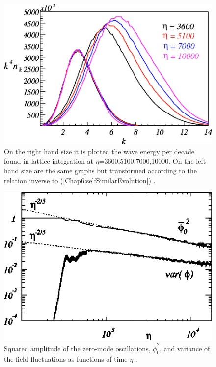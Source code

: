 \documentclass[11pt,a4paper,twoside]{book}
\begin{document}
\begin{figure}
	\centering
	\includegraphics[width=0.6\linewidth, height=0.3\textheight]{Images/Chap6/TurbolentThermalitation_fig3}
	\caption{On the right hand size it is plotted the wave energy per decade found in lattice integration at $\eta$=3600,5100,7000,10000. On the left hand size are the same graphs but transformed according to the relation inverse to (\ref{Chap6:selfSimilarEvolution}) \cite{Chap6:TurbolentThermalitation}. }
	\label{fig:turbolentthermalitationfig3}
\end{figure}
\begin{figure}
	\centering
	\includegraphics[width=0.6\linewidth, height=0.3\textheight]{Images/Chap6/TurbolentThermalitation_fig1}
	\caption{Squared amplitude of the zero-mode oscillations, $\bar{\phi}_{0}^{2}$, and variance of the field fluctuations as functions of time $\eta$ \cite{Chap6:TurbolentThermalitation}.}
	\label{fig:turbolentthermalitationfig1}
\end{figure}
\end{document}
